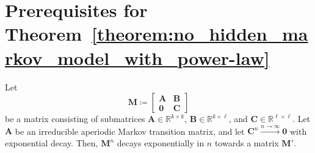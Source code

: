 \documentclass[../../main.tex]{subfiles}
\begin{document}
\section{Prerequisites for Theorem~\ref{theorem:no_hidden_markov_model_with_power-law}}
\label{section:prerequisites_for_theorem}
\begin{lemma}
    \label{lemma:exponential_convergence_with_open_states}
    Let
    \[
        \bm{M} \coloneqq
        \begin{bmatrix}
            \bm{A} & \bm{B} \\
            \bm{0} & \bm{C}
        \end{bmatrix}
    \]
    be a matrix consisting of submatrices \( \bm{A} \in \mathbb{R}^{k \times k} \), \( \bm{B} \in \mathbb{R}^{k \times \ell} \), and \( \bm{C} \in \mathbb{R}^{\ell \times \ell} \). Let $\bm{A}$ be an irreducible aperiodic Markov transition matrix, and let $\bm{C}^n \xrightarrow{n \to \infty} \bm{0}$ with exponential decay.
    Then, $\bm{M}^n$ decays exponentially in $n$ towards a matrix $\bm{M}'$.
\end{lemma}
\end{document}
